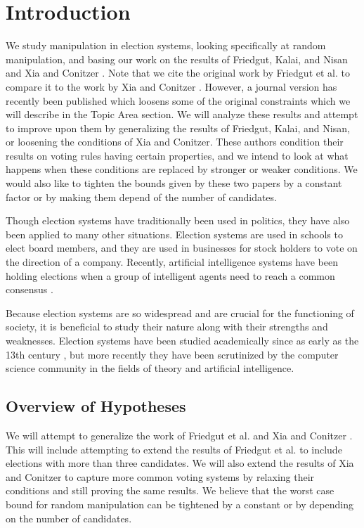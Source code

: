 
\chapter{Introduction}

We study manipulation in election systems, looking specifically at random manipulation, and basing our work on the results of Friedgut, Kalai, and Nisan \cite{friedgut2008elections} and Xia and Conitzer \cite{xia2008sufficient}. Note that we cite the original work by Friedgut et al. \cite{friedgut2008elections} to compare it to the work by Xia and Conitzer \cite{xia2008sufficient}. However, a journal version has recently been published which loosens some of the original constraints \cite{friedgut2011quantitative} which we will describe in the Topic Area section. We will analyze these results and attempt to improve upon them by generalizing the results of Friedgut, Kalai, and Nisan, or loosening the conditions of Xia and Conitzer.  These authors condition their results on voting rules having certain properties, and we intend to look at what happens when these conditions are replaced by stronger or weaker conditions. We would also like to tighten the bounds given by these two papers by a constant factor or by making them depend of the number of candidates.

Though election systems have traditionally been used in politics, they have also been applied to many other situations. Election systems are used in schools to elect board members, and they are used in businesses for stock holders to vote on the direction of a company. Recently, artificial intelligence systems have been holding elections when a group of intelligent agents need to reach a common consensus \cite{ephrati1991clarke, ephrati1993multi, pennock2000social, dwork2001rank, fagin2003efficient}.

Because election systems are so widespread and are crucial for the functioning of society, it is beneficial to study their nature along with their strengths and weaknesses. Election systems have been studied academically since as early as the 13th century \cite{hägele2001llull}, but more recently they have been scrutinized by the computer science community in the fields of theory and artificial intelligence.


\section{Overview of Hypotheses}

We will attempt to generalize the work of Friedgut et al. \cite{friedgut2008elections} and Xia and Conitzer \cite{xia2008sufficient}. This will include attempting to extend the results of Friedgut et al. \cite{friedgut2008elections} to include elections with more than three candidates. We will also extend the results of Xia and Conitzer \cite{xia2008sufficient} to capture more common voting systems by relaxing their conditions and still proving the same results. We believe that the worst case bound for random manipulation can be tightened by a constant or by depending on the number of candidates.
